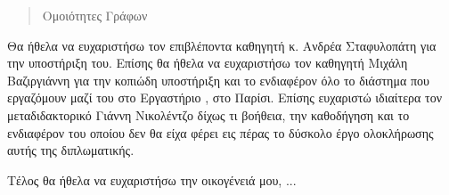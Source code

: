 \begin{abstract}

\begin{keywords}Ομοιότητες Γράφων
\end{keywords}
\end{abstract}


\begin{abstracteng}
\tl{}


\begin{keywordseng}
\end{keywordseng}
\end{abstracteng}

\begin{acknowledgements}
Θα ήθελα να ευχαριστήσω τον επιβλέποντα καθηγητή κ. Ανδρέα Σταφυλοπάτη για την υποστήριξη του.
Επίσης θα ήθελα να ευχαριστήσω τον καθηγητή Μιχάλη Βαζιργιάννη για την κοπιώδη υποστήριξη και το ενδιαφέρον όλο το διάστημα που εργαζόμουν μαζί του στο Εργαστήριο , στο Παρίσι. 
Επίσης ευχαριστώ ιδιαίτερα τον μεταδιδακτορικό Γιάννη Νικολέντζο δίχως τι βοήθεια, την καθοδήγηση και το ενδιαφέρον του οποίου δεν θα είχα φέρει εις πέρας το δύσκολο έργο ολοκλήρωσης αυτής της διπλωματικής.

Τέλος θα ήθελα να ευχαριστήσω την οικογένειά μου, ...
\end{acknowledgements}



